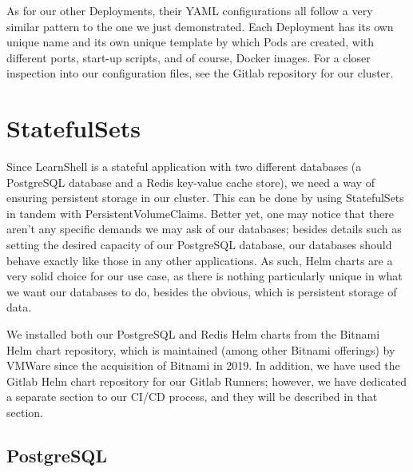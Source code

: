 \documentclass[thesis=B,english]{FITthesis}[2019/12/23]
\begin{document}
As for our other Deployments, their YAML configurations all follow a very similar pattern to the one we just demonstrated. Each Deployment has its own unique name and its own unique template by which Pods are created, with different ports, start-up scripts, and of course, Docker images. For a closer inspection into our configuration files, see the Gitlab repository for our cluster.

\newpage

\section{StatefulSets}

Since LearnShell is a stateful application with two different databases (a PostgreSQL database and a Redis key-value cache store), we need a way of ensuring persistent storage in our cluster. This can be done by using StatefulSets in tandem with PersistentVolumeClaims. Better yet, one may notice that there aren't any specific demands we may ask of our databases; besides details such as setting the desired capacity of our PostgreSQL database, our databases should behave exactly like those in any other applications. As such, Helm charts are a very solid choice for our use case, as there is nothing particularly unique in what we want our databases to do, besides the obvious, which is persistent storage of data.

We installed both our PostgreSQL and Redis Helm charts from the Bitnami Helm chart repository, which is maintained (among other Bitnami offerings) by VMWare since the acquisition of Bitnami in 2019. \cite{bitnami} In addition, we have used the Gitlab Helm chart repository for our Gitlab Runners; however, we have dedicated a separate section to our CI/CD process, and they will be described in that section.

\subsection{PostgreSQL}
\end{document}

